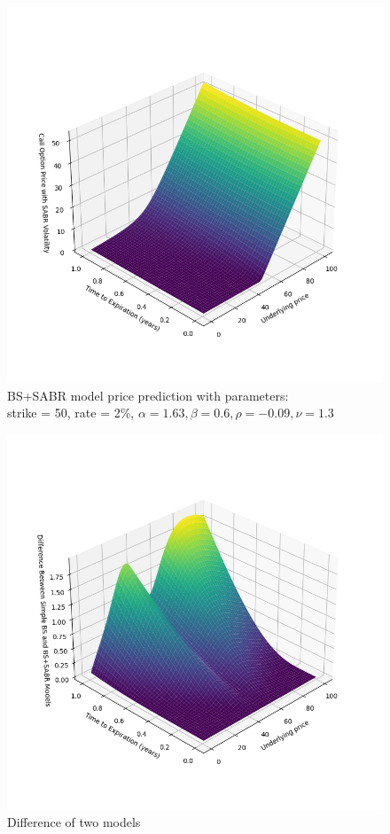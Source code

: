 \documentclass[a4paper,fleqn,12pt]{extarticle}
\begin{document}
	\begin{figure}[ht]
		\centering
		\includegraphics[width=1\textwidth]{pngs/bs_with_sabr.png}
		\caption{BS+SABR model price prediction with parameters: \\
		strike = 50, rate = 2\%, $\alpha = 1.63, \beta = 0.6, \rho = -0.09, \nu = 1.3$}
	\end{figure}
	\begin{figure}[ht]
		\centering
		\includegraphics[width=1\textwidth]{pngs/bs_simple_vs_bs_sabr.png}
		\caption{Difference of two models}
	\end{figure}
\end{document}
